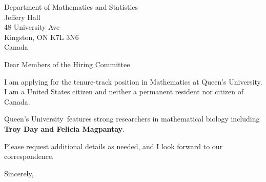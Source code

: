 




	
	
	\def\School{Queen's University}
	
	\begin{letter}
		{Department of Mathematics and Statistics\\
			Jeffery Hall\\
			48 University Ave\\
			Kingston, ON K7L 3N6\\
			Canada
		}
		
		\opening{Dear Members of the Hiring Committee}
		
		
		I am applying for the tenure-track position in Mathematics at \School. I am a United States citizen and neither a permanent resident nor citizen of Canada.
		
		
		
		\School~features strong researchers in mathematical biology including \textbf{Troy Day and Felicia Magpantay}. 
		
		
		
		
		
		Please request additional details as needed, and I look forward to our correspondence.
		
		\closing{Sincerely,}
	\end{letter}
